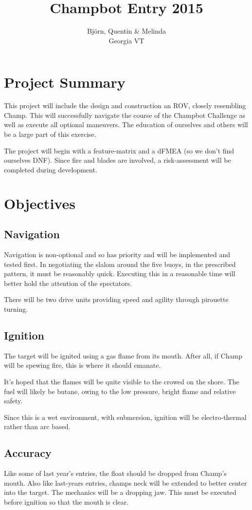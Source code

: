 \documentclass[]{article}
\title{Champbot Entry 2015}
\author{Bj{\"o}rn, Quentin \& Melinda\\Georgia VT}
\begin{document}
\maketitle

\section{Project Summary}
This project will include the design and construction an ROV, closely resembling Champ.
This will successfully navigate the course of the Champbot Challenge as well as execute all optional maneuvers.
The education of ourselves and others will be a large part of this exercise.  

The project will begin with a feature-matrix and a dFMEA (so we don't find ourselves DNF).
Since fire and blades are involved, a risk-assessment will be completed during development.

\section{Objectives}
\subsection{Navigation}
Navigation is non-optional and so has priority and will be implemented and tested first.
In negotiating the slalom around the five buoys, in the prescribed pattern, it must be reasonably quick.
Executing this in a reasonable time will better hold the attention of the spectators.

There will be two drive units providing speed and agility through pirouette turning.


\subsection{Ignition}
The target will be ignited using a gas flame from its mouth.
After all, if Champ will be spewing fire, this is where it should emanate.

It's hoped that the flames will be quite visible to the crowed on the shore.
The fuel will likely be butane, owing to the low pressure, bright flame and relative safety.

Since this is a wet environment, with submersion, ignition will be electro-thermal rather than arc based.

\subsection{Accuracy}
Like some of last year's entries, the float should be dropped from Champ's mouth.
Also like last-years entries, champs neck will be extended to better center into the target.
The mechanics will be a dropping jaw. This must be executed before ignition so that the mouth is clear. 
\end{document}
